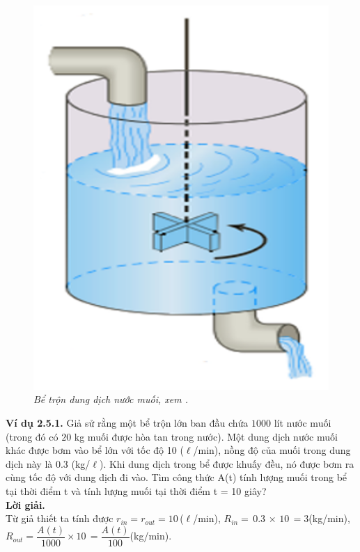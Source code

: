  \begin{figure}[H]
 	\centering
 	\includegraphics[scale=0.5]{Images/hinh_2_11.png}
 	\caption[Bể trộn dung dịch nước muối, xem \cite{ref4}. 
 	]{\itshape\fontsize{13pt}{0pt}\selectfont\centering Bể trộn dung dịch nước muối, xem \cite{ref4}.}
 	\label{hinh2.11}
 \end{figure}
\noindent\textbf{Ví dụ 2.5.1.} Giả sử rằng một bể trộn lớn ban đầu chứa $1000$ lít nước muối (trong đó có $20$ kg muối được hòa tan trong nước). Một dung dịch nước muối khác được bơm vào bể lớn với tốc độ 10 ($\ell$/min), nồng độ của muối trong dung dịch này là 0.3 (kg/$\ell$). Khi dung dịch trong bể được khuấy đều, nó được bơm ra cùng tốc độ với dung dịch đi vào. Tìm công thức A(t) tính lượng muối trong bể tại thời điểm t và tính lượng muối tại thời điểm t = 10 giây?\\
\textbf{Lời giải.}\\
Từ giả thiết ta tính được ${{r}_{in}}={{r}_{out}}=10\,$($\ell$/min), ${{R}_{in}}=\,0.3\,\times \,10\,=3$(kg/min), \newline ${{R}_{out}}=\dfrac{A(t)}{1000}\times 10\,=\dfrac{A(t)}{100}$(kg/min).\\
